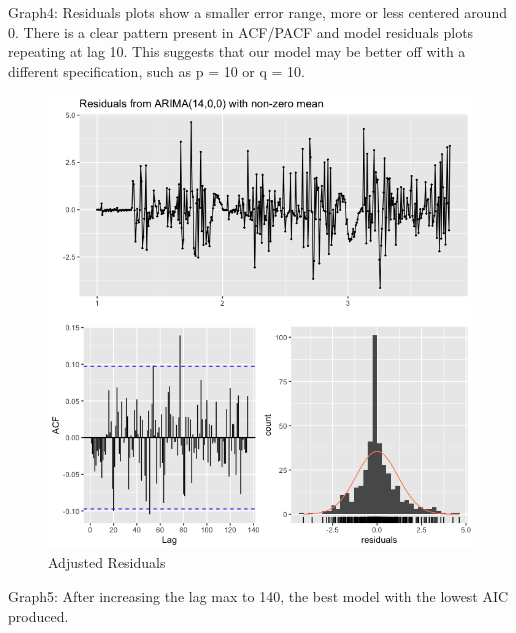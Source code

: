 \documentclass[]{article}
\begin{document}
Graph4: Residuals plots show a smaller error range, more or less
centered around 0. There is a clear pattern present in ACF/PACF and
model residuals plots repeating at lag 10. This suggests that our model
may be better off with a different specification, such as p = 10 or q =
10.

\begin{figure}
\centering
\includegraphics{AdjustResiduals.png}
\caption{Adjusted Residuals}
\end{figure}

Graph5: After increasing the lag max to 140, the best model with the
lowest AIC produced.
\end{document}
